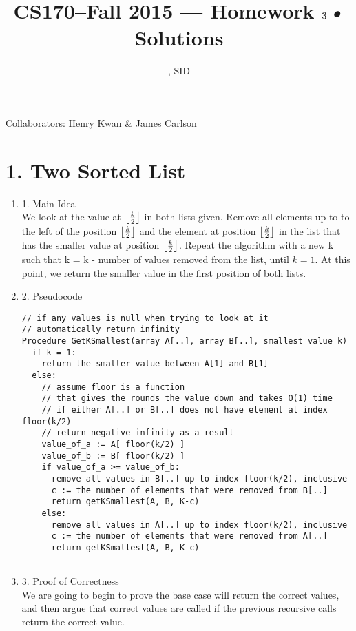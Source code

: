\documentclass[11pt]{article}
\title{CS170--Fall 2015 --- Homework $3$\textsl{•} Solutions}
\author{\Name, SID \SID}
\date{}
\DeclarePairedDelimiter\floor{\lfloor}{\rfloor}
\newenvironment{qparts}{\begin{enumerate}[{(}a{)}]}{\end{enumerate}}
\begin{document}
\maketitle

Collaborators: Henry Kwan \& James Carlson

\section*{1. Two Sorted List}
\begin{qparts}
\item[1.] Main Idea \\
We look at the value at $\floor*{\frac{k}{2}}$ in both lists given. Remove all elements up to to the left of the position $\floor*{\frac{k}{2}}$ and the element at position $\floor*{\frac{k}{2}}$ in the list that has the smaller value at position $\floor*{\frac{k}{2}}$. Repeat the algorithm with a new k such that k = k - number of values removed from the list, until $k = 1$. At this point, we return the smaller value in the first position of both lists.

\item[2.] Pseudocode 
\begin{verbatim}
// if any values is null when trying to look at it
// automatically return infinity
Procedure GetKSmallest(array A[..], array B[..], smallest value k) 
  if k = 1:
    return the smaller value between A[1] and B[1]
  else:
    // assume floor is a function 
    // that gives the rounds the value down and takes O(1) time
    // if either A[..] or B[..] does not have element at index floor(k/2)
    // return negative infinity as a result
    value_of_a := A[ floor(k/2) ]
    value_of_b := B[ floor(k/2) ]
    if value_of_a >= value_of_b:
      remove all values in B[..] up to index floor(k/2), inclusive
      c := the number of elements that were removed from B[..]
      return getKSmallest(A, B, K-c)
    else:
      remove all values in A[..] up to index floor(k/2), inclusive
      c := the number of elements that were removed from A[..]
      return getKSmallest(A, B, K-c)
    
\end{verbatim}

\item[3.] Proof of Correctness \\
We are going to begin to prove the base case will return the correct values, and then argue that correct values are called if the previous recursive calls return the correct value. \\


\end{qparts}
\end{document}
